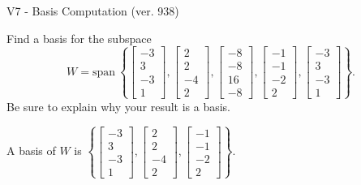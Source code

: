 \begin{exercise}
  \begin{exerciseTitle}V7 - Basis Computation (ver. 938)\end{exerciseTitle}
  \begin{exerciseStatement}
    Find a basis for the subspace 
\[W=\mathrm{span}\ \left\{\left[\begin{array}{r}
-3 \\
3 \\
-3 \\
1
\end{array}\right] , \left[\begin{array}{r}
2 \\
2 \\
-4 \\
2
\end{array}\right] , \left[\begin{array}{r}
-8 \\
-8 \\
16 \\
-8
\end{array}\right] , \left[\begin{array}{r}
-1 \\
-1 \\
-2 \\
2
\end{array}\right] , \left[\begin{array}{r}
-3 \\
3 \\
-3 \\
1
\end{array}\right]\right\}.\]
 Be sure to explain why your result is a basis.


  \end{exerciseStatement}
  \begin{exerciseAnswer}
   A basis of \(W\) is  \(\left\{\left[\begin{array}{r}
-3 \\
3 \\
-3 \\
1
\end{array}\right] , \left[\begin{array}{r}
2 \\
2 \\
-4 \\
2
\end{array}\right] , \left[\begin{array}{r}
-1 \\
-1 \\
-2 \\
2
\end{array}\right]\right\}\).
  


  \end{exerciseAnswer}
\end{exercise}